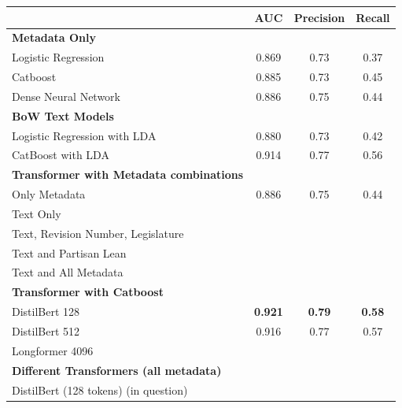 \documentclass[11pt]{article}
\begin{document}
\begin{tabular}{ l  c  c  c}
  & AUC & Precision & Recall  \\
 \hline
 \textbf{Metadata Only} & & & \\
\hspace{3mm}Logistic Regression & 0.869 & 0.73 & 0.37 \\
\hspace{3mm}Catboost  & 0.885 & 0.73 & 0.45 \\
\hspace{3mm} Dense Neural Network & 0.886 &  0.75 & 0.44 \\
\hline
\textbf{BoW Text Models} & & & \\
\hspace{3mm}Logistic Regression with LDA & 0.880 & 0.73 & 0.42 \\
\hspace{3mm}CatBoost with LDA & 0.914 & 0.77 & 0.56 \\ 
\hline
\textbf{Transformer with Metadata combinations} & & & \\
\hspace{3mm}Only Metadata & 0.886 &  0.75 & 0.44 \\
\hspace{3mm}Text Only & & & \\
\hspace{3mm}Text, Revision Number, Legislature & & & \\
\hspace{3mm}Text and Partisan Lean & & & \\
\hspace{3mm}Text and All Metadata & & & \\
\hline
\textbf{Transformer with Catboost} & & & \\
\hspace{3mm}DistilBert 128 & \textbf{0.921} & \textbf{0.79} & \textbf{0.58} \\
\hspace{3mm}DistilBert 512 & 0.916 & 0.77 & 0.57 \\
\hspace{3mm}Longformer 4096 &  &  &  \\
\hline
\textbf{Different Transformers (all metadata)} & & & \\
\hspace{3mm}DistilBert (128 tokens) (in question) & & & \\

\hline

\end{tabular}
\end{document}

